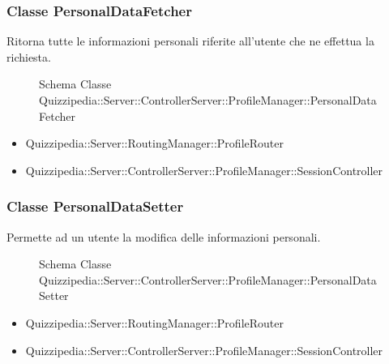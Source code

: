 \subsubsection{Classe PersonalDataFetcher}
Ritorna tutte le informazioni personali riferite all'utente che ne effettua la richiesta.
\begin{figure}[H]
\centering
\noindent{}
\caption{Schema Classe Quizzipedia::Server::ControllerServer::ProfileManager::PersonalDataFetcher}
\end{figure}
\begin{itemize}
\item Quizzipedia::Server::RoutingManager::ProfileRouter
\end{itemize}
\begin{itemize}
\item Quizzipedia::Server::ControllerServer::ProfileManager::SessionController
\end{itemize}
\subsubsection{Classe PersonalDataSetter}
Permette ad un utente la modifica delle informazioni personali.
\begin{figure}[H]
\centering
\noindent{}
\caption{Schema Classe Quizzipedia::Server::ControllerServer::ProfileManager::PersonalDataSetter}
\end{figure}
\begin{itemize}
\item Quizzipedia::Server::RoutingManager::ProfileRouter
\end{itemize}
\begin{itemize}
\item Quizzipedia::Server::ControllerServer::ProfileManager::SessionController
\end{itemize}
